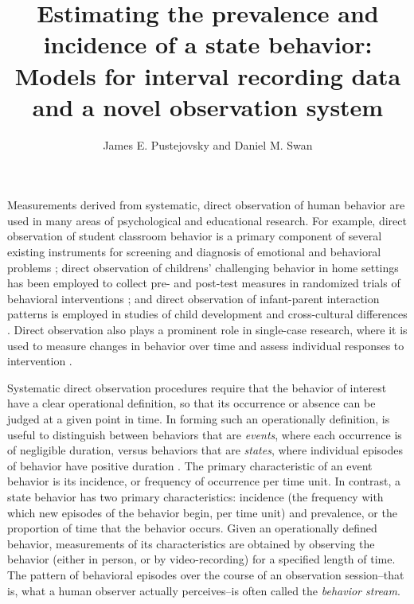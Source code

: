 \documentclass[man, noextraspace, floatsintext]{apa6}\usepackage[]{graphicx}\usepackage[]{color}
\title{Estimating the prevalence and incidence of a state behavior: Models for interval recording data and a novel observation system}
\author{James E. Pustejovsky and Daniel M. Swan}
\affiliation{The University of Texas at Austin}
\begin{document}
\maketitle

Measurements derived from systematic, direct observation of human behavior are used in many areas of psychological and educational research. 
For example, direct observation of student classroom behavior is a primary component of several existing instruments for screening and diagnosis of emotional and behavioral problems \citep{Volpe2005observing}; direct observation of childrens' challenging behavior in home settings has been employed to collect pre- and post-test measures in randomized trials of behavioral interventions \citep[e.g.,][]{Durand2012positive}; and direct observation of infant-parent interaction patterns is employed in studies of child development \citep{Mann1991time} and cross-cultural differences \citep{Bornstein2002measurement}. 
Direct observation also plays a prominent role in single-case research, where it is used to measure changes in behavior over time and assess individual responses to intervention \citep{Kazdin2011single}.

Systematic direct observation procedures require that the behavior of interest have a clear operational definition, so that its occurrence or absence can be judged at a given point in time. 
In forming such an operationally definition, is useful to distinguish between behaviors that are \textit{events}, where each occurrence is of negligible duration, versus behaviors that are \textit{states}, where individual episodes of behavior have positive duration \citep{Altmann1974observational}. 
The primary characteristic of an event behavior is its incidence, or frequency of occurrence per time unit. 
In contrast, a state behavior has two primary characteristics: incidence (the frequency with which new episodes of the behavior begin, per time unit) and prevalence, or the proportion of time that the behavior occurs. Given an operationally defined behavior, measurements of its characteristics are obtained by observing the behavior (either in person, or by video-recording) for a specified length of time. 
The pattern of behavioral episodes over the course of an observation session--that is, what a human observer actually perceives--is often called the \textit{behavior stream}. 
\end{document}
